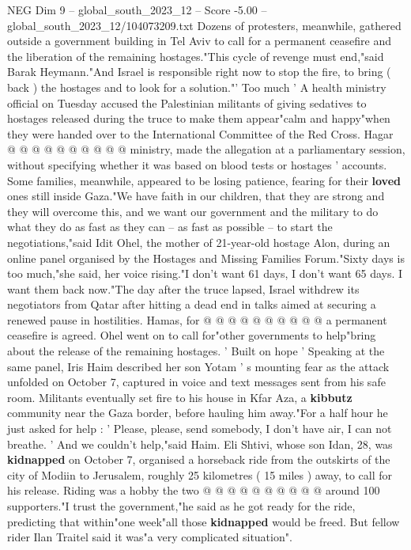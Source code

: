 \begin{textsample}{NEG Dim 9 – global\_south\_2023\_12 – Score -5.00 – global\_south\_2023\_12/104073209.txt}
Dozens of protesters, meanwhile, gathered outside a government building in Tel Aviv to call for a permanent ceasefire and the liberation of the remaining hostages."This cycle of revenge must end,"said Barak Heymann."And Israel is responsible right now to stop the fire, to bring ( back ) the hostages and to look for a solution."' Too much ' A health ministry official on Tuesday accused the Palestinian militants of giving sedatives to hostages released during the truce to make them appear"calm and happy"when they were handed over to the International Committee of the Red Cross.
Hagar @ @ @ @ @ @ @ @ @ @ ministry, made the allegation at a parliamentary session, without specifying whether it was based on blood tests or hostages ' accounts.
Some families, meanwhile, appeared to be losing patience, fearing for their \textbf{loved} ones still inside Gaza."We have faith in our children, that they are strong and they will overcome this, and we want our government and the military to do what they do as fast as they can -- as fast as possible -- to start the negotiations,"said Idit Ohel, the mother of 21-year-old hostage Alon, during an online panel organised by the Hostages and Missing Families Forum."Sixty days is too much,"she said, her voice rising."I don't want 61 days, I don't want 65 days.
I want them back now."The day after the truce lapsed, Israel withdrew its negotiators from Qatar after hitting a dead end in talks aimed at securing a renewed pause in hostilities.
Hamas, for @ @ @ @ @ @ @ @ @ @ a permanent ceasefire is agreed.
Ohel went on to call for"other governments to help"bring about the release of the remaining hostages. ' Built on hope ' Speaking at the same panel, Iris Haim described her son Yotam ' s mounting fear as the attack unfolded on October 7, captured in voice and text messages sent from his safe room.
Militants eventually set fire to his house in Kfar Aza, a \textbf{kibbutz} community near the Gaza border, before hauling him away."For a half hour he just asked for help : ' Please, please, send somebody, I don't have air, I can not breathe. ' And we couldn't help,"said Haim.
Eli Shtivi, whose son Idan, 28, was \textbf{kidnapped} on October 7, organised a horseback ride from the outskirts of the city of Modiin to Jerusalem, roughly 25 kilometres ( 15 miles ) away, to call for his release.
Riding was a hobby the two @ @ @ @ @ @ @ @ @ @ around 100 supporters."I trust the government,"he said as he got ready for the ride, predicting that within"one week"all those \textbf{kidnapped} would be freed.
But fellow rider Ilan Traitel said it was"a very complicated situation".

\end{textsample}
